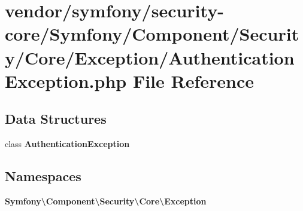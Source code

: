 \section{vendor/symfony/security-\/core/\+Symfony/\+Component/\+Security/\+Core/\+Exception/\+Authentication\+Exception.php File Reference}
\label{_authentication_exception_8php}
\subsection*{Data Structures}
\begin{DoxyCompactItemize}
\item 
class {\bf Authentication\+Exception}
\end{DoxyCompactItemize}
\subsection*{Namespaces}
\begin{DoxyCompactItemize}
\item 
 {\bf Symfony\textbackslash{}\+Component\textbackslash{}\+Security\textbackslash{}\+Core\textbackslash{}\+Exception}
\end{DoxyCompactItemize}
